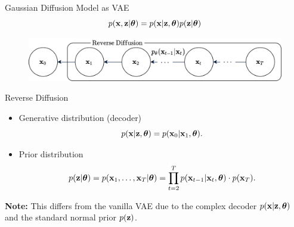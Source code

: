 \documentclass{beamer}
\begin{document}
\begin{frame}{Gaussian Diffusion Model as VAE}
    \vspace{-0.3cm}
    \[
        p(\mathbf{x}, \mathbf{z} | \boldsymbol{\theta}) = p(\mathbf{x} | \mathbf{z}, \boldsymbol{\theta}) p(\mathbf{z} | \boldsymbol{\theta})
    \]    
    \vspace{-0.3cm}
    \begin{figure}
        \includegraphics[width=0.8\linewidth]{figs/diffusion_pgm_reverse}
    \end{figure}
    \vspace{-0.2cm}
    \begin{block}{Reverse Diffusion}
        \begin{itemize}
            \item Generative distribution (decoder)
            \[
                p(\mathbf{x} | \mathbf{z}, \boldsymbol{\theta}) = p(\mathbf{x}_0 | \mathbf{x}_1, \boldsymbol{\theta}).
            \]
            \item Prior distribution
            \vspace{-0.3cm}
            \[
                p(\mathbf{z} | \boldsymbol{\theta}) = p(\mathbf{x}_1, \dots, \mathbf{x}_T | \boldsymbol{\theta}) = \prod_{t=2}^T p(\mathbf{x}_{t - 1} | \mathbf{x}_t, \boldsymbol{\theta})  \cdot p(\mathbf{x}_T).
            \]
        \end{itemize}
        \textbf{Note:} This differs from the vanilla VAE due to the complex decoder $p(\mathbf{x} | \mathbf{z}, \boldsymbol{\theta})$ and the standard normal prior $p(\mathbf{z})$.
    \end{block}
\end{frame}
\end{document}
